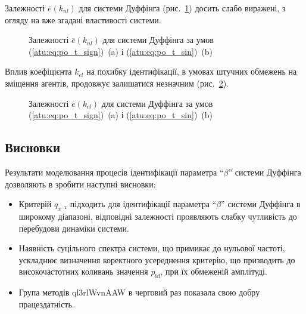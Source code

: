 Залежності $ \overline{e}(k_{nl})$ для системи Дуффінга (рис.~\ref{atu:f:duff_e_k_nl}) досить
слабо виражені, з огляду на вже згадані властивості системи.


\begin{figure}[ht!]
  \caption{Залежності $\overline{e}(k_{nl}) $ для системи Дуффінга за умов (\ref{atu:eq:po_t_sign})~(a) і (\ref{atu:eq:po_t_sin})~(b)}
\label{atu:f:duff_e_k_nl}
\end{figure}

Вплив коефіцієнта
$k_{cl}$ на похибку ідентифікації, в умовах штучних обмежень
на зміщення агентів, продовжує залишатися незначним
(рис.~\ref{atu:f:duff_e_k_cl}).

\begin{figure}[ht!]
  \caption{Залежності $ \overline{e} (k_{cl}) $ для системи Дуффінга за умов (\ref{atu:eq:po_t_sign})~(a) і (\ref{atu:eq:po_t_sin})~(b)}
\label{atu:f:duff_e_k_cl}
\end{figure}



\subsection{Висновки}%

Результати моделювання процесів ідентифікації параметра
``$\beta$'' системи Дуффінга дозволяють в зробити наступні висновки:

\begin{itemize}

  \item
    Критерій
    $q_{x^{-2}}$ підходить для ідентифікації параметра ``$\beta$'' системи
    Дуффінга в широкому діапазоні, відповідні залежності проявляють
    слабку чутливість до перебудови динаміки системи.

  \item
    Наявність суцільного спектра системи, що примикає до нульової
    частоті, ускладнює визначення коректного усереднення критерію,
    що призводить до високочастотних коливань значення
    $ p_\mathrm{id} $, при їх обмеженій амплітуді.

  \item
    Група методів ql3rlWvnAAW в черговий раз показала свою добру
    працездатність.


\end{itemize}





